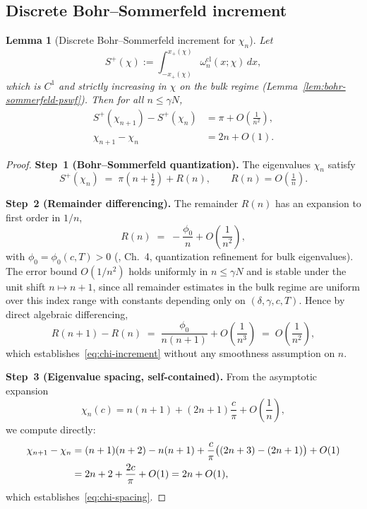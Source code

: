 \documentclass[12pt,a4paper]{amsart}
\newtheorem{lemma}[theorem]{Lemma}
\newcommand{\wncl}{\omega_n^{\mathrm{cl}}}
\begin{document}
\subsection{Discrete Bohr--Sommerfeld increment}

\begin{lemma}[Discrete Bohr--Sommerfeld increment for $\chi_n$]
\label{lem:chi-increment}
Let
\[
  S^+(\chi) := \int_{-x_+(\chi)}^{x_+(\chi)} \wncl(x;\chi)\,dx,
\]
which is $C^1$ and strictly increasing in $\chi$ on the bulk
regime (Lemma~\ref{lem:bohr-sommerfeld-pswf}).
Then for all $n \le \gamma N$,
\begin{align}
  S^+(\chi_{n+1}) - S^+(\chi_n)
    &= \pi + O\!\left(\tfrac{1}{n^2}\right),
  \label{eq:chi-increment}\\
  \chi_{n+1} - \chi_n
    &= 2n + O(1).
  \label{eq:chi-spacing}
\end{align}
\end{lemma}

\begin{proof}
\textbf{Step~1 (Bohr--Sommerfeld quantization).}
The eigenvalues $\chi_n$ satisfy
\[
  S^+(\chi_n) \;=\; \pi\!\left(n + \tfrac{1}{2}\right) + R(n),
  \qquad R(n) = O\!\left(\tfrac{1}{n}\right).
\]

\textbf{Step~2 (Remainder differencing).}
The remainder $R(n)$ has an expansion to first order in $1/n$,
\[
  R(n) \;=\; -\frac{\phi_0}{n} + O\!\left(\frac{1}{n^2}\right),
\]
with $\phi_0 = \phi_0(c,T) > 0$
(\cite{OsipovRokhlinXiao}, Ch.~4,
quantization refinement for bulk eigenvalues).
The error bound $O(1/n^2)$ holds uniformly in $n \le \gamma N$
and is stable under the unit shift $n \mapsto n+1$, since all
remainder estimates in the bulk regime are uniform over this
index range with constants depending only on
$(\delta, \gamma, c, T)$.
Hence by direct algebraic differencing,
\[
  R(n+1) - R(n)
  \;=\; \frac{\phi_0}{n(n+1)} + O\!\left(\frac{1}{n^3}\right)
  \;=\; O\!\left(\frac{1}{n^2}\right),
\]
which establishes~\eqref{eq:chi-increment} without any smoothness
assumption on $n$.

\textbf{Step~3 (Eigenvalue spacing, self-contained).}
From the asymptotic expansion
\[
  \chi_n(c) = n(n+1) + (2n+1)\frac{c}{\pi} + O\!\left(\frac{1}{n}\right),
\]
we compute directly:
\begin{align}
  \chi_{n+1} - \chi_n
  &= (n+1)(n+2) - n(n+1)
     + \frac{c}{\pi}\bigl((2n+3)-(2n+1)\bigr)
     + O(1) \notag \\
  &= 2n + 2 + \frac{2c}{\pi} + O(1)
   = 2n + O(1),
\end{align}
which establishes~\eqref{eq:chi-spacing}.
\end{proof}
\end{document}

